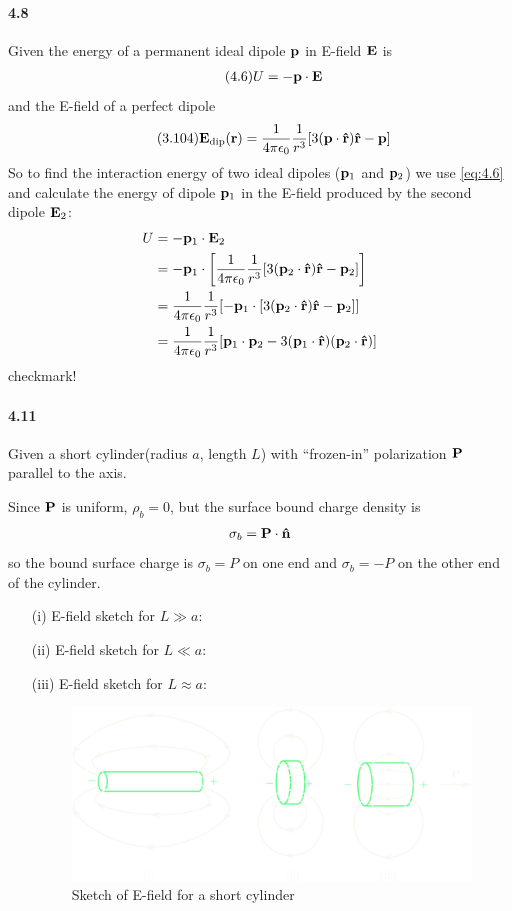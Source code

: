 \documentclass[../main.tex]{subfiles}
\begin{document}
\newpage
\paragraph{4.8}
Given the energy of a permanent ideal dipole $\vb p$ in E-field $\vb E$ is
\begin{align*} \tag{4.6} \label{eq:4.6}
    U = -\vb p \cdot \vb E
\end{align*}
and the E-field of a perfect dipole
\begin{align*} \tag{3.104}
    \vb E_\text{dip} (\vb r) = \frac{1}{4\pi\epsilon_0} \frac{1}{r^3} [3(\vb p \cdot \vu r) \vu r - \vb p]
\end{align*}
So to find the interaction energy of two ideal dipoles ($\vb p_1$ and $\vb p_2$) we use \eqref{eq:4.6} and calculate the energy of dipole $\vb p_1$ in the E-field produced by the second dipole $\vb E_2$:
\begin{align*}
    U &= -\vb p_1 \cdot \vb E_2 \\
    &= -\vb p_1 \cdot \qt[\ke \frac{1}{r^3} [3(\vb p_2 \cdot \vu r) \vu r - \vb p_2]] \\
    &= \ke \frac{1}{r^3} [-\vb p_1 \cdot [3(\vb p_2 \cdot \vu r) \vu r - \vb p_2]] \\
    &= \ke \frac{1}{r^3} \qt[\vb p_1 \cdot \vb p_2 - 3 (\vb p_1 \cdot \vu r)(\vb p_2 \cdot \vu r)]
\end{align*}
checkmark!

\newpage
\paragraph{4.11} Given a short cylinder(radius $a$, length $L$) with ``frozen-in'' polarization $\vb P$ parallel to the axis.

Since $\vb P$ is uniform, $\rho_b = 0$, but the surface bound charge density is
    \begin{align*}
        \sigma_b = \vb P \cdot \vu n
    \end{align*}
    so the bound surface charge is $\sigma_b = P$ on one end and $\sigma_b = -P$ on the other end of the cylinder. 
\begin{itemize}
    \item [(i)] E-field sketch for $L \gg a$:
    \item [(ii)] E-field sketch for $L \ll a$:
    \item [(iii)] E-field sketch for $L \approx a$:
    \begin{figure}[ht]
        \centering
        \includegraphics[width=0.8\linewidth]{hw4_11.png}
        \captionsetup{width=0.8\linewidth}
        \caption{Sketch of E-field for a short cylinder}
    \end{figure}
\end{itemize}
\end{document}
